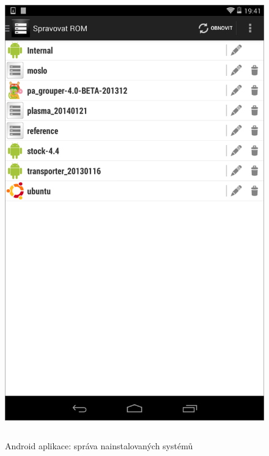 \documentclass[12pt, a4paper, oneside]{article}
\begin{document}
\begin{figure}[H]
\begin{center}
 \includegraphics[height=550pt]{img/app_roms.png}
\caption{Android aplikace: správa nainstalovaných systémů}
\end{center}
\end{figure}
\end{document}
